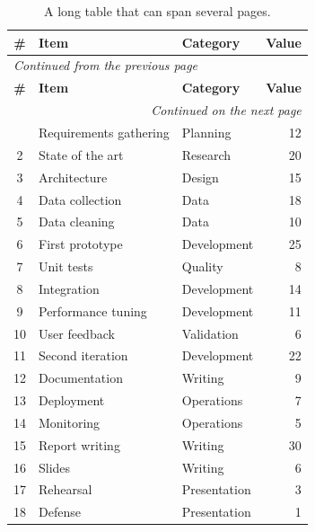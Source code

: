 \begin{longtable}{c l l r}
  \caption{A long table that can span several pages.}
  \label{tab:long} \\
  \toprule
  \textbf{\#} & \textbf{Item} & \textbf{Category} & \textbf{Value} \\
  \midrule
  \endfirsthead
  \multicolumn{4}{l}{\small\itshape Continued from the previous page} \\
  \toprule
  \textbf{\#} & \textbf{Item} & \textbf{Category} & \textbf{Value} \\
  \midrule
  \endhead
  \midrule
  \multicolumn{4}{r}{\small\itshape Continued on the next page} \\
  \endfoot
  \bottomrule
  \endlastfoot
  1  & Requirements gathering & Planning     & 12 \\
  2  & State of the art       & Research     & 20 \\
  3  & Architecture           & Design       & 15 \\
  4  & Data collection        & Data         & 18 \\
  5  & Data cleaning          & Data         & 10 \\
  6  & First prototype        & Development  & 25 \\
  7  & Unit tests             & Quality      & 8  \\
  8  & Integration            & Development  & 14 \\
  9  & Performance tuning     & Development  & 11 \\
  10 & User feedback          & Validation   & 6  \\
  11 & Second iteration       & Development  & 22 \\
  12 & Documentation          & Writing      & 9  \\
  13 & Deployment             & Operations   & 7  \\
  14 & Monitoring             & Operations   & 5  \\
  15 & Report writing         & Writing      & 30 \\
  16 & Slides                 & Writing      & 6  \\
  17 & Rehearsal              & Presentation & 3  \\
  18 & Defense                & Presentation & 1  \\
\end{longtable}
